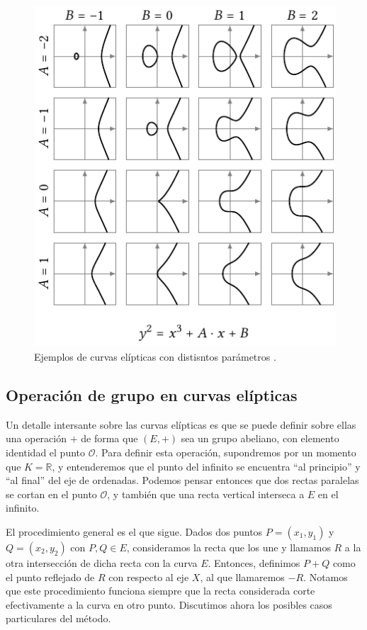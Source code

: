 \documentclass[
  a4paper,
  12pt,
  spanish,
]{scrartcl}
\begin{document}
\begin{figure}[h]
  \centering
  \includegraphics[width=.75\textwidth]{img/parametros-curvas}
  \caption{Ejemplos de curvas elípticas con distisntos parámetros \parencite{eichlseder_elliptic_2016}.}
  \label{fig:parametros}
\end{figure}


\subsection{Operación de grupo en curvas elípticas}

Un detalle intersante sobre las curvas elípticas es que se puede definir sobre ellas una operación $+$ de forma que $(E, +)$ sea un grupo abeliano, con elemento identidad el punto $\mathcal{O}$. Para definir esta operación, supondremos por un momento que $K = \mathbb{R}$, y entenderemos que el punto del infinito se encuentra ``al principio'' y ``al final'' del eje de ordenadas. Podemos pensar entonces que dos rectas paralelas se cortan en el punto $\mathcal{O}$, y también que una recta vertical interseca a $E$ en el infinito.

    El procedimiento general es el que sigue. Dados dos puntos $P = (x_1, y_1)$ y $Q = (x_2, y_2)$ con $P,Q \in E$, consideramos la recta que los une y llamamos $R$ a la otra intersección de dicha recta con la curva $E$. Entonces, definimos $P + Q$ como el punto reflejado de $R$ con respecto al eje $X$, al que llamaremos $-R$. Notamos que este procedimiento funciona siempre que la recta considerada corte efectivamente a la curva en otro punto. Discutimos ahora los posibles casos particulares del método.
    
\end{document}
